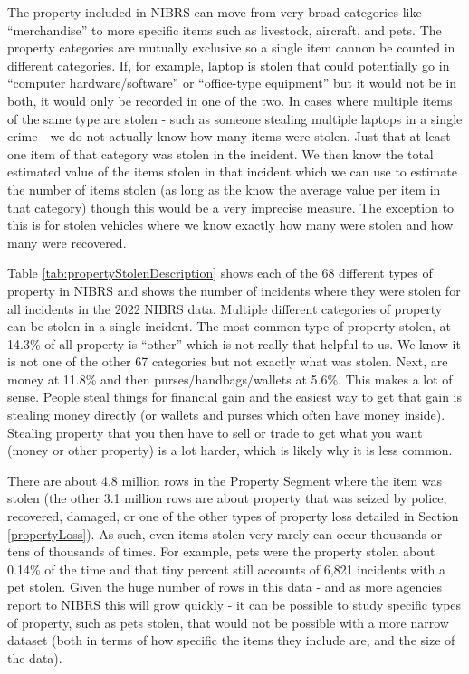 \documentclass[
]{krantz}
\begin{document}
The property included in NIBRS can move from very broad
categories like ``merchandise'' to more specific items such
as livestock, aircraft, and pets. The property categories
are mutually exclusive so a single item cannon be counted in
different categories. If, for example, laptop is stolen that
could potentially go in ``computer hardware/software'' or
``office-type equipment'' but it would not be in both, it
would only be recorded in one of the two. In cases where
multiple items of the same type are stolen - such as someone
stealing multiple laptops in a single crime - we do not
actually know how many items were stolen. Just that at least
one item of that category was stolen in the incident. We
then know the total estimated value of the items stolen in
that incident which we can use to estimate the number of
items stolen (as long as the know the average value per item
in that category) though this would be a very imprecise
measure. The exception to this is for stolen vehicles where
we know exactly how many were stolen and how many were
recovered.

Table \ref{tab:propertyStolenDescription} shows each of the
68 different types of property in NIBRS and shows the number
of incidents where they were stolen for all incidents in the
2022 NIBRS data. Multiple different categories of property
can be stolen in a single incident. The most common type of
property stolen, at 14.3\% of all property is ``other''
which is not really that helpful to us. We know it is not
one of the other 67 categories but not exactly what was
stolen. Next, are money at 11.8\% and then
purses/handbags/wallets at 5.6\%. This makes a lot of sense.
People steal things for financial gain and the easiest way
to get that gain is stealing money directly (or wallets and
purses which often have money inside). Stealing property
that you then have to sell or trade to get what you want
(money or other property) is a lot harder, which is likely
why it is less common.

There are about 4.8 million rows in the Property Segment
where the item was stolen (the other 3.1 million rows are
about property that was seized by police, recovered,
damaged, or one of the other types of property loss detailed
in Section \ref{propertyLoss}). As such, even items stolen
very rarely can occur thousands or tens of thousands of
times. For example, pets were the property stolen about
0.14\% of the time and that tiny percent still accounts of
6,821 incidents with a pet stolen. Given the huge number of
rows in this data - and as more agencies report to NIBRS
this will grow quickly - it can be possible to study
specific types of property, such as pets stolen, that would
not be possible with a more narrow dataset (both in terms of
how specific the items they include are, and the size of the
data).
\end{document}

